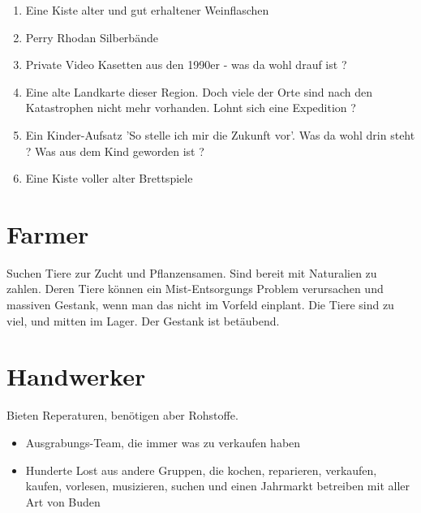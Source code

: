 \begin{enumerate}
    \item Eine Kiste alter und gut erhaltener Weinflaschen
    \item Perry Rhodan Silberbände
    \item Private Video Kasetten aus den 1990er - was da wohl drauf ist ?
    \item Eine alte Landkarte dieser Region. Doch viele der Orte sind nach den Katastrophen nicht mehr vorhanden. Lohnt sich eine Expedition ?
    \item Ein Kinder-Aufsatz 'So stelle ich mir die Zukunft vor'. Was da wohl drin steht ? Was aus dem Kind geworden ist ?
    \item Eine Kiste voller alter Brettspiele
\end{enumerate}

\section{Farmer}

Suchen Tiere zur Zucht und Pflanzensamen. Sind bereit mit Naturalien zu zahlen. Deren Tiere können ein Mist-Entsorgungs Problem verursachen und massiven Gestank, wenn man das nicht im Vorfeld einplant. Die Tiere sind zu viel, und mitten im Lager. Der Gestank ist betäubend.


\section{Handwerker}

Bieten Reperaturen, benötigen aber Rohstoffe.

\begin{itemize}
\item Ausgrabungs-Team, die immer was zu verkaufen haben
\item Hunderte Lost aus andere Gruppen, die kochen, reparieren, verkaufen, kaufen, vorlesen, musizieren, suchen und einen Jahrmarkt betreiben mit aller Art von Buden
\end{itemize}

